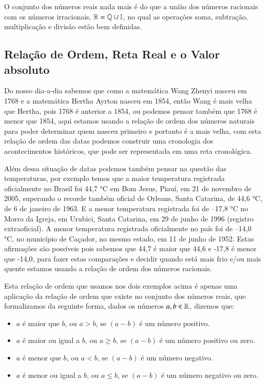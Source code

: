 O conjunto dos números reais nada mais é do que a união dos números racionais com os números irracionais, $\mathbb{R}= \mathbb{Q} \cup \mathbb{I}$, no qual as operações soma, subtração, multiplicação e divisão estão bem definidas.

\subsection{Relação de Ordem, Reta Real e o Valor absoluto}

Do nosso dia-a-dia sabemos que como a matemática Wang Zhenyi nasceu em 1768 e a matemática Hertha Ayrton nasceu em 1854, então Wang é mais velha que Hertha, pois 1768 é anterior a 1854, ou podemos pensar também que 1768 é  menor que 1854, aqui estamos usando a relação de ordem dos números naturais para poder determinar quem nasceu primeiro e portanto é a mais velha, com esta relação de ordem das datas podemos construir uma cronologia dos acontecimentos históricos, que pode ser representada em uma reta cronológica.

Além dessa situação de datas podemos também pensar na questão das temperaturas, por exemplo temos que a maior temperatura registrada oficialmente no Brasil foi 44,7 °C em Bom Jesus, Piauí, em 21 de novembro de 2005, superando o recorde também oficial de Orleans, Santa Catarina, de 44,6 °C, de 6 de janeiro de 1963. E a menor temperatura registrada foi de –17,8 °C no Morro da Igreja, em Urubici, Santa Catarina, em 29 de junho de 1996 (registro extraoficial). A menor temperatura registrada oficialmente no país foi de –14,0 °C, no município de Caçador, no mesmo estado, em 11 de junho de 1952. Estas afirmações são possíveis pois sabemos que 44,7 é maior que 44,6 e -17,8 é menor que -14,0, para fazer estas comparações e decidir quando está mais frio e/ou mais quente estamos usando a relação de ordem dos números racionais.

Esta relação de ordem que usamos nos dois exemplos acima é apenas uma aplicação da relação de ordem que existe no conjunto dos números reais, que formalizamos da seguinte forma, dados os números $a, b \in \mathbb{R}$, dizemos que:

\begin{itemize}
\item $a$ é maior que $b$, ou $a > b$, se $(a - b)$ é um número positivo.
\item $a$ é maior ou igual a $b$, ou $a \geq b$, se $(a - b)$ é um número positivo ou zero.
\item $a$ é menor que $b$, ou $a < b$, se $(a - b)$ é um número negativo.
\item $a$ é menor ou igual a $b$, ou $a \leq b$, se $(a - b)$ é um número negativo ou zero.
\end{itemize}

